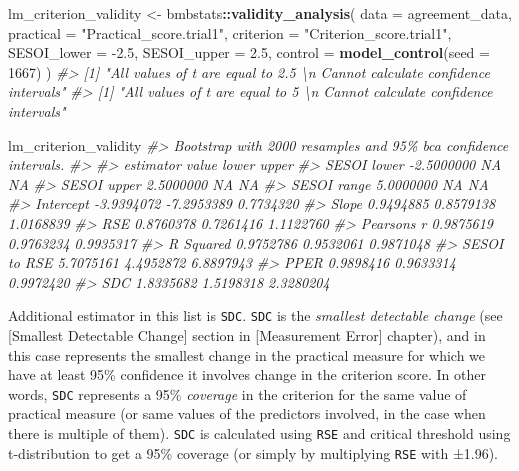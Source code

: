 \documentclass[
]{book}
\newenvironment{Shaded}{\begin{snugshade}}{\end{snugshade}}
\newcommand{\CommentTok}[1]{\textcolor[rgb]{0.56,0.35,0.01}{\textit{#1}}}
\newcommand{\DataTypeTok}[1]{\textcolor[rgb]{0.13,0.29,0.53}{#1}}
\newcommand{\DecValTok}[1]{\textcolor[rgb]{0.00,0.00,0.81}{#1}}
\newcommand{\FloatTok}[1]{\textcolor[rgb]{0.00,0.00,0.81}{#1}}
\newcommand{\KeywordTok}[1]{\textcolor[rgb]{0.13,0.29,0.53}{\textbf{#1}}}
\newcommand{\NormalTok}[1]{#1}
\newcommand{\OperatorTok}[1]{\textcolor[rgb]{0.81,0.36,0.00}{\textbf{#1}}}
\newcommand{\StringTok}[1]{\textcolor[rgb]{0.31,0.60,0.02}{#1}}
\begin{document}
\begin{Shaded}
\begin{Highlighting}[]
\NormalTok{lm\_criterion\_validity <{-}}\StringTok{ }\NormalTok{bmbstats}\OperatorTok{::}\KeywordTok{validity\_analysis}\NormalTok{(}
  \DataTypeTok{data =}\NormalTok{ agreement\_data,}
  \DataTypeTok{practical =} \StringTok{"Practical\_score.trial1"}\NormalTok{,}
  \DataTypeTok{criterion =} \StringTok{"Criterion\_score.trial1"}\NormalTok{,}
  \DataTypeTok{SESOI\_lower =} \FloatTok{{-}2.5}\NormalTok{,}
  \DataTypeTok{SESOI\_upper =} \FloatTok{2.5}\NormalTok{,}
  \DataTypeTok{control =} \KeywordTok{model\_control}\NormalTok{(}\DataTypeTok{seed =} \DecValTok{1667}\NormalTok{)}
\NormalTok{)}
\CommentTok{\#> [1] "All values of t are equal to  2.5 \textbackslash{}n Cannot calculate confidence intervals"}
\CommentTok{\#> [1] "All values of t are equal to  5 \textbackslash{}n Cannot calculate confidence intervals"}

\NormalTok{lm\_criterion\_validity}
\CommentTok{\#> Bootstrap with 2000 resamples and 95\% bca confidence intervals.}
\CommentTok{\#> }
\CommentTok{\#>     estimator      value      lower     upper}
\CommentTok{\#>   SESOI lower {-}2.5000000         NA        NA}
\CommentTok{\#>   SESOI upper  2.5000000         NA        NA}
\CommentTok{\#>   SESOI range  5.0000000         NA        NA}
\CommentTok{\#>     Intercept {-}3.9394072 {-}7.2953389 0.7734320}
\CommentTok{\#>         Slope  0.9494885  0.8579138 1.0168839}
\CommentTok{\#>           RSE  0.8760378  0.7261416 1.1122760}
\CommentTok{\#>   Pearson\textquotesingle{}s r  0.9875619  0.9763234 0.9935317}
\CommentTok{\#>     R Squared  0.9752786  0.9532061 0.9871048}
\CommentTok{\#>  SESOI to RSE  5.7075161  4.4952872 6.8897943}
\CommentTok{\#>          PPER  0.9898416  0.9633314 0.9972420}
\CommentTok{\#>           SDC  1.8335682  1.5198318 2.3280204}
\end{Highlighting}
\end{Shaded}

Additional estimator in this list is \texttt{SDC}. \texttt{SDC} is the \emph{smallest detectable change} (see {[}Smallest Detectable Change{]} section in {[}Measurement Error{]} chapter), and in this case represents the smallest change in the practical measure for which we have at least 95\% confidence it involves change in the criterion score. In other words, \texttt{SDC} represents a 95\% \emph{coverage} in the criterion for the same value of practical measure (or same values of the predictors involved, in the case when there is multiple of them). \texttt{SDC} is calculated using \texttt{RSE} and critical threshold using t-distribution to get a 95\% coverage (or simply by multiplying \texttt{RSE} with ±1.96).
\end{document}
